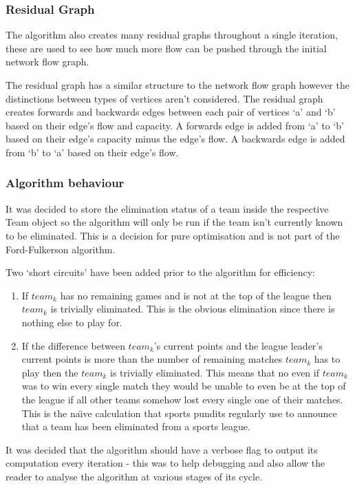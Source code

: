 \subsubsection{Residual Graph}

The algorithm also creates many residual graphs throughout a single iteration,
these are used to see how much more flow can be pushed through the initial
network flow graph.

The residual graph has a similar structure to the network flow graph however
the distinctions between types of vertices aren't considered. The residual
graph creates forwards and backwards edges between each pair of vertices `a'
and `b' based on their edge's flow and capacity. A forwards edge is added from
`a' to `b' based on their edge's capacity minus the edge's flow. A backwards 
edge is added from `b' to `a' based on their edge's flow.


\subsubsection{Algorithm behaviour}

It was decided to store the elimination status of a team inside the
respective Team object so the algorithm will only be run if the team isn't
currently known to be eliminated. This is a decision for pure optimisation and 
is not part of the Ford-Fulkerson algorithm.

Two `short circuits' have been added prior to the algorithm for efficiency:
\begin{enumerate}
\item If $team_k$ has no remaining games and is not at the top of the league
then $team_k$ is trivially eliminated. This is the obvious elimination since
there is nothing else to play for.
\item If the difference between $team_k$'s current points and the league 
leader's current points is more than the number of remaining matches $team_k$ 
has to play then the $team_k$ is trivially eliminated. This means that no even 
if $team_k$ was to win every single match they would be unable to even be at 
the top of the league if all other teams somehow lost every single one of their 
matches. This is the na\"{\i}ve calculation that sports pundits regularly use 
to announce that a team has been eliminated from a sports league.
\end{enumerate}

It was decided that the algorithm should have a verbose flag to output
its computation every iteration - this was to help debugging and also
allow the reader to analyse the algorithm at various stages of its
cycle. 

